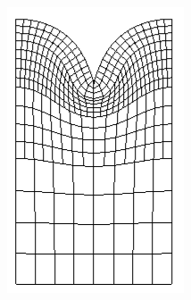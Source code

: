 \documentclass[11pt]{report}
\begin{document}
\begin{figure}[!htb]
\begin{center}
\begin{subfigure}[b]{0.22\textwidth}
		\includegraphics[width=\textwidth]{mesh/mesh_piece_const_10_9_1_high}
	\end{subfigure}
	\begin{subfigure}[b]{0.22\textwidth}

\end{subfigure}
\end{center}
\end{figure}
\end{document}
